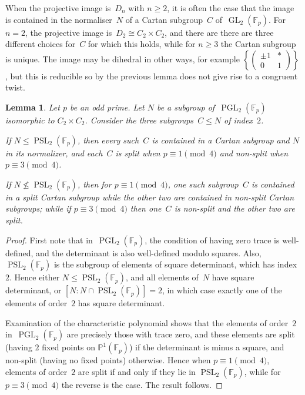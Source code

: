 \documentclass[12pt, reqno]{amsart}
\newcommand{\F}{\mathbb{F}}
\newcommand{\PP}{\mathbb{P}}
\newcommand{\GL}{\operatorname{GL}}
\newcommand{\PGL}{\operatorname{PGL}}
\newcommand{\PSL}{\operatorname{PSL}}
\numberwithin{equation}{section}
\newtheorem{lemma}[theorem]{Lemma}
\theoremstyle{definition}
\theoremstyle{remark}
\begin{document}
When the projective image is~$D_n$ with $n\ge2$, it is often the case
that the image is contained in the normaliser~$N$ of a Cartan
subgroup~$C$ of~$\GL_2(\F_p)$.  For $n=2$, the projective image
is~$D_2\cong C_2\times C_2$, and there are there are three different
choices for~$C$ for which this holds, while for $n\ge3$ the Cartan
subgroup is unique.  The image may be dihedral in other ways, for
example $\left\{\begin{pmatrix}\pm1&*\\0&1\end{pmatrix}\right\}$, but
this is reducible so by the previous lemma does not give rise to a
congruent twist.

\begin{lemma}\label{L:C2xC2}
Let $p$ be an odd prime.  Let $N$ be a subgroup of~$\PGL_2(\F_p)$
isomorphic to $C_2\times C_2$. Consider the three subgroups~$C\le N$
of index~$2$.

If $N\le\PSL_2(\F_p)$, then every such~$C$ is contained in a Cartan
subgroup and $N$ in its normalizer, and each~$C$ is split when
$p\equiv1\pmod4$ and non-split when $p\equiv3\pmod4$.

If $N\not\le\PSL_2(\F_p)$, then for $p\equiv1\pmod4$, one such
subgroup~$C$ is contained in a split Cartan subgroup while the other
two are contained in non-split Cartan subgroups; while if
$p\equiv3\pmod4$ then one~$C$ is non-split and the other two are
split.
\end{lemma}

\begin{proof}
  First note that in~$\PGL_2(\F_p)$, the condition of having zero
  trace is well-defined, and the determinant is also well-defined
  modulo squares.  Also, $\PSL_2(\F_p)$ is the subgroup of elements of
  square determinant, which has index~$2$.  Hence either
  $N\le\PSL_2(\F_p)$, and all elements of~$N$ have square determinant,
  or $[N:N\cap\PSL_2(\F_p)]=2$, in which case exactly one of the
  elements of order~$2$ has square determinant.

  Examination of the characteristic polynomial shows that the elements
  of order~$2$ in~$\PGL_2(\F_p)$ are precisely those with trace zero,
  and these elements are split (having $2$ fixed points on
  $\PP^1(\F_p)$) if the determinant is minus a square, and non-split
  (having no fixed points) otherwise.  Hence when $p\equiv1\pmod4$,
  elements of order~$2$ are split if and only if they lie in
  $\PSL_2(\F_p)$, while for $p\equiv3\pmod4$ the reverse is the case.
  The result follows.
\end{proof}
\end{document}
